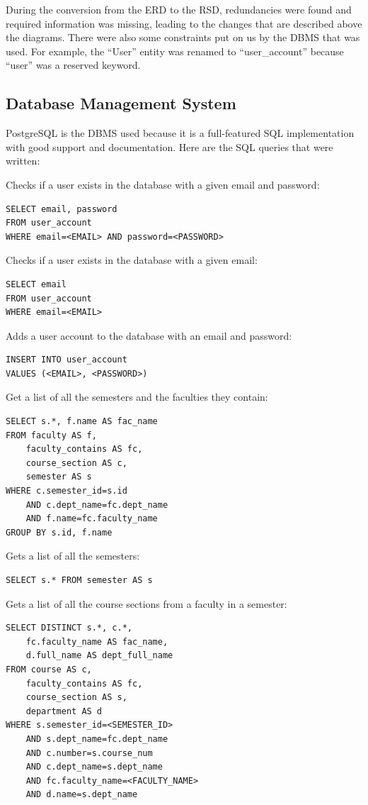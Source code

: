 \documentclass[twoside=false,a4paper,11pt]{article}
\theoremstyle{mytheor}
\begin{document}
During the conversion from the ERD to the RSD, redundancies were found and required information was missing, leading to the changes that are described above the diagrams. There were also some constraints put on us by the DBMS that was used. For example, the ``User'' entity was renamed to ``user\_account'' because ``user'' was a reserved keyword.

\subsection*{Database Management System}

PostgreSQL is the DBMS used because it is a full-featured SQL implementation with good support and documentation. Here are the SQL queries that were written:

Checks if a user exists in the database with a given email and password:
\begin{lstlisting}
SELECT email, password
FROM user_account
WHERE email=<EMAIL> AND password=<PASSWORD>
\end{lstlisting}

Checks if a user exists in the database with a given email:
\begin{lstlisting}
SELECT email
FROM user_account
WHERE email=<EMAIL>
\end{lstlisting}

Adds a user account to the database with an email and password:
\begin{lstlisting}
INSERT INTO user_account
VALUES (<EMAIL>, <PASSWORD>)
\end{lstlisting}

Get a list of all the semesters and the faculties they contain:
\begin{lstlisting}
SELECT s.*, f.name AS fac_name
FROM faculty AS f,
	faculty_contains AS fc,
	course_section AS c,
	semester AS s
WHERE c.semester_id=s.id
	AND c.dept_name=fc.dept_name
	AND f.name=fc.faculty_name
GROUP BY s.id, f.name
\end{lstlisting}

Gets a list of all the semesters:
\begin{lstlisting}
SELECT s.* FROM semester AS s
\end{lstlisting}

Gets a list of all the course sections from a faculty in a semester:
\begin{lstlisting}
SELECT DISTINCT s.*, c.*,
	fc.faculty_name AS fac_name,
	d.full_name AS dept_full_name
FROM course AS c,
	faculty_contains AS fc,
	course_section AS s,
	department AS d
WHERE s.semester_id=<SEMESTER_ID>
	AND s.dept_name=fc.dept_name
	AND c.number=s.course_num
	AND c.dept_name=s.dept_name
	AND fc.faculty_name=<FACULTY_NAME>
	AND d.name=s.dept_name
\end{lstlisting}
\end{document}
